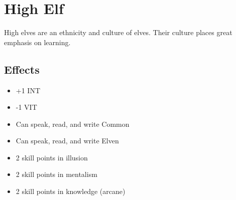 \section{High Elf}\label{culture:high-elf}
High elves are an ethnicity and culture of elves. Their culture places great
emphasis on learning.

\subsection{Effects}
\begin{itemize}
    \item +1 INT
    \item -1 VIT
    \item Can speak, read, and write Common
    \item Can speak, read, and write Elven
    \item 2 skill points in illusion
    \item 2 skill points in mentalism
    \item 2 skill points in knowledge (arcane)
\end{itemize}
